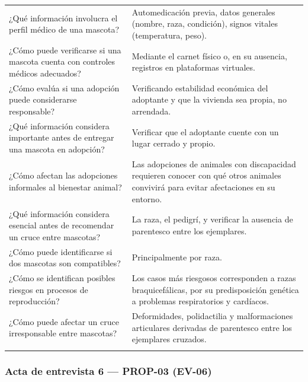 \documentclass[journal,onecolumn]{IEEEtran}
\begin{document}
{\begin{longtable}{@{}p{5.6cm} p{9.4cm}@{}}
		¿Qué información involucra el perfil médico de una mascota? & Automedicación previa, datos generales (nombre, raza, condición), signos vitales (temperatura, peso). \\ \addlinespace
		
		¿Cómo puede verificarse si una mascota cuenta con controles médicos adecuados? & Mediante el carnet físico o, en su ausencia, registros en plataformas virtuales. \\ \addlinespace
		
		¿Cómo evalúa si una adopción puede considerarse responsable? & Verificando estabilidad económica del adoptante y que la vivienda sea propia, no arrendada. \\ \addlinespace
		
		¿Qué información considera importante antes de entregar una mascota en adopción? & Verificar que el adoptante cuente con un lugar cerrado y propio. \\ \addlinespace
		
		¿Cómo afectan las adopciones informales al bienestar animal? & Las adopciones de animales con discapacidad requieren conocer con qué otros animales convivirá para evitar afectaciones en su entorno. \\ \addlinespace
		
		¿Qué información considera esencial antes de recomendar un cruce entre mascotas? & La raza, el pedigrí, y verificar la ausencia de parentesco entre los ejemplares. \\ \addlinespace
		
		¿Cómo puede identificarse si dos mascotas son compatibles? & Principalmente por raza. \\ \addlinespace
		
		¿Cómo se identifican posibles riesgos en procesos de reproducción? & Los casos más riesgosos corresponden a razas braquicefálicas, por su predisposición genética a problemas respiratorios y cardíacos. \\ \addlinespace
		
		¿Cómo puede afectar un cruce irresponsable entre mascotas? & Deformidades, polidactilia y malformaciones articulares derivadas de parentesco entre los ejemplares cruzados. \\ \addlinespace
		
	\end{longtable}
}


\subsubsection*{Acta de entrevista 6 --- PROP-03 (EV-06)}
\end{document}
